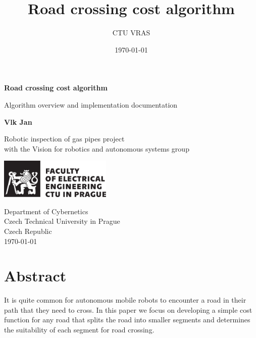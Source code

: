 \documentclass[oneside]{article}
\title{Road crossing cost algorithm}
\author{CTU VRAS}
\date{\today}
\begin{document}
    \begin{titlepage}
        \begin{center}
            \vspace*{1cm}

            \textbf{\huge Road crossing cost algorithm}

            \vspace{0.5cm}

            Algorithm overview and implementation documentation
                    
            \vspace{1.5cm}

            \textbf{Vlk Jan}

            \vfill
                    
            Robotic inspection of gas pipes project\\
            with the Vision for robotics and autonomous systems group
                    
            \vspace{0.8cm}
            
            \includegraphics[width=0.4\textwidth]{electrical_engeneering_cb.pdf}

            \vspace{0.8cm}
                    
            Department of Cybernetics\\
            Czech Technical University in Prague\\
            Czech Republic\\
            \today
                    
        \end{center}
    \end{titlepage}
    \section*{Abstract}
    It is quite common for autonomous mobile robots to encounter a road in their path that they need to cross. In this paper we focus on developing a simple cost function for any road that splits the road into smaller segments and determines the suitability of each segment for road crossing.
\end{document}
